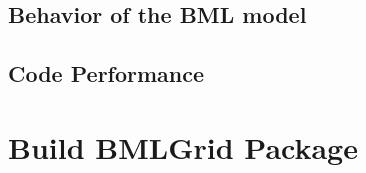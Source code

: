 \documentclass[twocolumn]{article}
\begin{document}
\subsection{Behavior of the BML model}

\subsection{Code Performance}

\section{Build BMLGrid Package}

%
%

\end{document}
